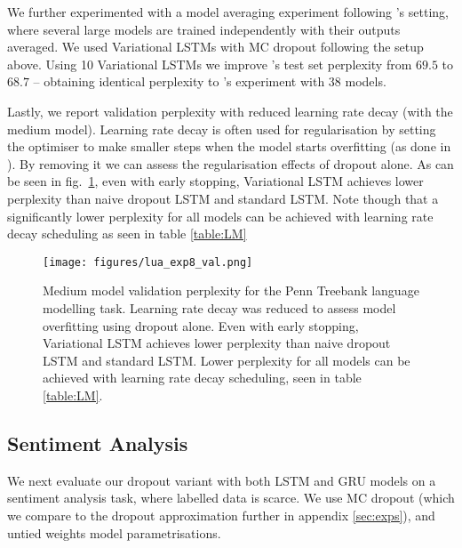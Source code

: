 \documentclass{article}
\theoremstyle{definition}
\begin{document}
We further experimented with a model averaging experiment following \citep{zaremba2014recurrent}'s setting, where several large models are trained independently with their outputs averaged.
We used Variational LSTMs with MC dropout following the setup above.
Using 10 Variational LSTMs we improve \citep{zaremba2014recurrent}'s test set perplexity from $69.5$ to $68.7$ -- obtaining identical perplexity to \citep{zaremba2014recurrent}'s experiment with 38 models. 

Lastly, we report validation perplexity with reduced learning rate decay (with the medium model). 
Learning rate decay is often used for regularisation by setting the optimiser to make smaller steps when the model starts overfitting (as done in \citep{zaremba2014recurrent}).
By removing it we can assess the regularisation effects of dropout alone.
As can be seen in fig.\ \ref{fig:LM}, 
even with early stopping, Variational LSTM achieves lower perplexity than naive dropout LSTM and standard LSTM. Note though that a significantly lower perplexity for all models can be achieved with learning rate decay scheduling as seen in table \ref{table:LM}






\begin{figure}[b!]
\vspace{-8mm}
\texttt{[image: figures/lua\_exp8\_val.png]}
\vspace{-7mm}
\caption{Medium model validation perplexity for the Penn Treebank language modelling task. Learning rate decay was reduced to assess model overfitting using dropout alone. Even with early stopping, Variational LSTM achieves lower perplexity than naive dropout LSTM and standard LSTM. 
Lower perplexity for all models can be achieved with learning rate decay scheduling, seen in table \ref{table:LM}.}
\label{fig:LM}
\vspace{2mm}
\end{figure}


\subsection{Sentiment Analysis}

We next evaluate our dropout variant with both LSTM and GRU models on a sentiment analysis task, where labelled data is scarce. We use MC dropout (which we compare to the dropout approximation further in appendix \ref{sec:exps}), and untied weights model parametrisations. 
\end{document}
